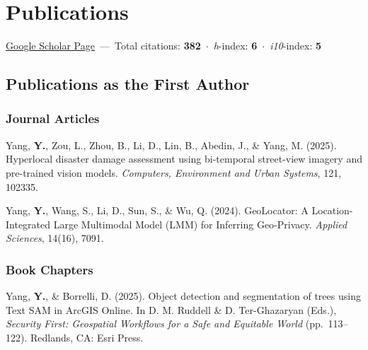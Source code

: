 \documentclass[10pt,letterpaper]{article}
\newenvironment{reflist}
  {\begin{list}{}{%
     \setlength{\leftmargin}{1.7em}\setlength{\itemindent}{-1.7em}%
     \setlength{\itemsep}{0.22em}\setlength{\parsep}{0pt}\setlength{\topsep}{0.25em}}}
  {\end{list}}
\begin{document}
\section{Publications}

\href{https://scholar.google.com/citations?user=B-fiSHwAAAAJ}{Google Scholar Page} \,---\, Total citations: \textbf{382} \,$\cdot$\, \textit{h}-index: \textbf{6} \,$\cdot$\, \textit{i10}-index: \textbf{5}

\subsection{Publications as the First Author}

\subsubsection{Journal Articles}
\begin{reflist}
  \item[] [1] Yang, \textbf{Y.}, Zou, L., Zhou, B., Li, D., Lin, B., Abedin, J., \& Yang, M. (2025). Hyperlocal disaster damage assessment using bi-temporal street-view imagery and pre-trained vision models. \textit{Computers, Environment and Urban Systems}, 121, 102335.
  \item[] [2] Yang, \textbf{Y.}, Wang, S., Li, D., Sun, S., \& Wu, Q. (2024). GeoLocator: A Location-Integrated Large Multimodal Model (LMM) for Inferring Geo-Privacy. \textit{Applied Sciences}, 14(16), 7091.
\end{reflist}

\subsubsection{Book Chapters}
\begin{reflist}
  \item[] [1] Yang, \textbf{Y.}, \& Borrelli, D. (2025). Object detection and segmentation of trees using Text SAM in ArcGIS Online. In D. M. Ruddell \& D. Ter-Ghazaryan (Eds.), \textit{Security First: Geospatial Workflows for a Safe and Equitable World} (pp.~113--122). Redlands, CA: Esri Press.
\end{reflist}
\end{document}
